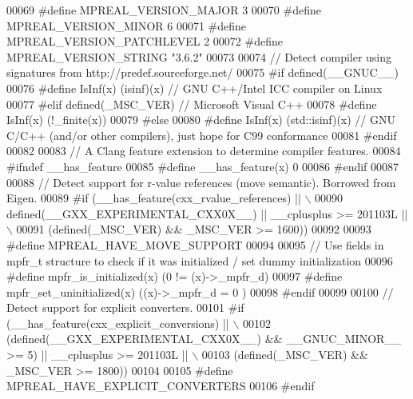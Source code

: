 \begin{DoxyCode}
00069 \textcolor{preprocessor}{#define MPREAL\_VERSION\_MAJOR 3}
00070 \textcolor{preprocessor}{#define MPREAL\_VERSION\_MINOR 6}
00071 \textcolor{preprocessor}{#define MPREAL\_VERSION\_PATCHLEVEL 2}
00072 \textcolor{preprocessor}{#define MPREAL\_VERSION\_STRING "3.6.2"}
00073 
00074 \textcolor{comment}{// Detect compiler using signatures from http://predef.sourceforge.net/}
00075 \textcolor{preprocessor}{#if defined(\_\_GNUC\_\_)}
00076 \textcolor{preprocessor}{    #define IsInf(x) (isinf)(x)                 // GNU C++/Intel ICC compiler on Linux}
00077 \textcolor{preprocessor}{#elif defined(\_MSC\_VER)                         // Microsoft Visual C++}
00078 \textcolor{preprocessor}{    #define IsInf(x) (!\_finite(x))}
00079 \textcolor{preprocessor}{#else}
00080 \textcolor{preprocessor}{    #define IsInf(x) (std::isinf)(x)              // GNU C/C++ (and/or other compilers), just hope for C99
       conformance}
00081 \textcolor{preprocessor}{#endif}
00082 
00083 \textcolor{comment}{// A Clang feature extension to determine compiler features.}
00084 \textcolor{preprocessor}{#ifndef \_\_has\_feature}
00085 \textcolor{preprocessor}{    #define \_\_has\_feature(x) 0}
00086 \textcolor{preprocessor}{#endif}
00087 
00088 \textcolor{comment}{// Detect support for r-value references (move semantic). Borrowed from Eigen.}
00089 \textcolor{preprocessor}{#if (\_\_has\_feature(cxx\_rvalue\_references) || \(\backslash\)}
00090 \textcolor{preprocessor}{       defined(\_\_GXX\_EXPERIMENTAL\_CXX0X\_\_) || \_\_cplusplus >= 201103L || \(\backslash\)}
00091 \textcolor{preprocessor}{      (defined(\_MSC\_VER) && \_MSC\_VER >= 1600))}
00092 
00093 \textcolor{preprocessor}{    #define MPREAL\_HAVE\_MOVE\_SUPPORT}
00094 
00095     \textcolor{comment}{// Use fields in mpfr\_t structure to check if it was initialized / set dummy initialization}
00096 \textcolor{preprocessor}{    #define mpfr\_is\_initialized(x)      (0 != (x)->\_mpfr\_d)}
00097 \textcolor{preprocessor}{    #define mpfr\_set\_uninitialized(x)   ((x)->\_mpfr\_d = 0 )}
00098 \textcolor{preprocessor}{#endif}
00099 
00100 \textcolor{comment}{// Detect support for explicit converters.}
00101 \textcolor{preprocessor}{#if (\_\_has\_feature(cxx\_explicit\_conversions) || \(\backslash\)}
00102 \textcolor{preprocessor}{       (defined(\_\_GXX\_EXPERIMENTAL\_CXX0X\_\_) && \_\_GNUC\_MINOR\_\_ >= 5) || \_\_cplusplus >= 201103L || \(\backslash\)}
00103 \textcolor{preprocessor}{       (defined(\_MSC\_VER) && \_MSC\_VER >= 1800))}
00104 
00105 \textcolor{preprocessor}{    #define MPREAL\_HAVE\_EXPLICIT\_CONVERTERS}
00106 \textcolor{preprocessor}{#endif}

\end{DoxyCode}

